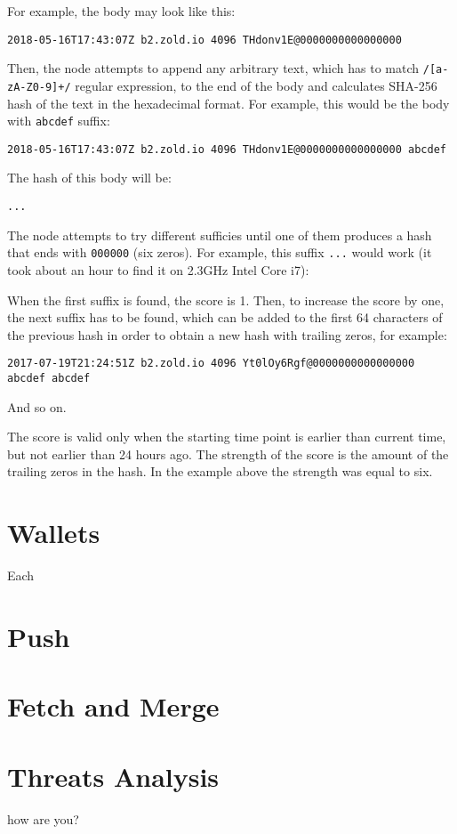 \documentclass[11pt,oneside]{article}
\begin{document}
For example, the body may look like this:

\begin{verbatim}
2018-05-16T17:43:07Z b2.zold.io 4096 THdonv1E@0000000000000000
\end{verbatim}

Then, the node attempts to append any arbitrary text, which has to match
\texttt{/[a-zA-Z0-9]+/} regular expression, to the end of the body and calculates
SHA-256 hash of the text in the hexadecimal format. For example, this would be the body
with \texttt{abcdef} suffix:

\begin{verbatim}
2018-05-16T17:43:07Z b2.zold.io 4096 THdonv1E@0000000000000000 abcdef
\end{verbatim}

The hash of this body will be:

\begin{verbatim}
...
\end{verbatim}

The node attempts to try different sufficies until one of them produces
a hash that ends with \texttt{000000} (six zeros). For example, this
suffix \texttt{...} would work
(it took about an hour to find it on 2.3GHz Intel Core i7):

When the first suffix is found, the score is 1. Then, to
increase the score by one, the next suffix has to be found, which
can be added to the first 64 characters of the previous hash
in order to obtain a new hash with trailing zeros, for example:

\begin{verbatim}
2017-07-19T21:24:51Z b2.zold.io 4096 Yt0lOy6Rgf@0000000000000000 abcdef abcdef
\end{verbatim}

And so on.

The score is valid only when the starting time point is earlier than
current time, but not earlier than 24 hours ago. The strength of the score
is the amount of the trailing zeros in the hash. In the example above the
strength was equal to six.

\section{Wallets}

Each

\section{Push}

\section{Fetch and Merge}

\section{Threats Analysis}

how are you?
\end{document}
